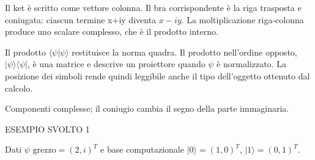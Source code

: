 Il ket è scritto come vettore colonna. Il bra corrispondente è la riga trasposta e coniugata: ciascun termine x+iy diventa \(x- iy\). La moltiplicazione riga-colonna produce uno scalare complesso, che è il prodotto interno.\par

Il prodotto \(\langle \psi |\psi \rangle \) restituisce la norma quadra. Il prodotto nell'ordine opposto, \(|\psi \rangle \langle \psi |\), è una matrice e descrive un proiettore quando \(\psi \) è normalizzato. La posizione dei simboli rende quindi leggibile anche il tipo dell'oggetto ottenuto dal calcolo.\par



Componenti complesse; il coniugio cambia il segno della parte immaginaria.\par


\Needspace{.36\textheight}\label{c2-bra-example-1}
{\sffamily\small\color{Accent} ESEMPIO SVOLTO 1\par}
Dati \(\psi \) \(\text{grezzo}=(2,\allowbreak i)^{T}\) e base computazionale \(|0\rangle =(1{,}0)^{T}\), \(|1\rangle =(0{,}1)^{T}\).\par


